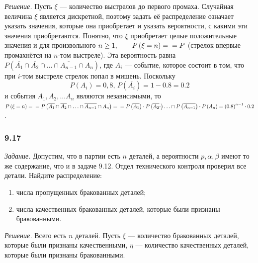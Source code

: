 \textit{Решение.} Пусть $ \xi $ --- количество выстрелов до первого промаха.
Случайная величина $ \xi $ является дискретной,
поэтому задать её распределение означает указать значения, которые она приобретает и указать вероятности, с какими эти значения приобретаются.
Понятно, что $ \xi $ приобретает целые положительные значения и для произвольного $n \geq 1, \qquad P \left( \xi = n \right) = \\
= P$
(стрелок впервые промахнётся на $n$-том выстреле).
Эта вероятность равна $P \left( \overline{A_1} \cap \overline{A_2} \cap \dotsc \cap \overline{A_{n-1}} \cap A_n \right) $,
где $A_i$ --- событие, которое состоит в том, что при $i$-том выстреле стрелок попал в мишень.
Поскольку
$$P \left( A_i \right) = 0,8, \,
P \left( \overline{A_i} \right) = 1 - 0.8 = 0.2$$
и события $A_1, A_2, \dotsc A_n$ являются независимыми,
то
$P \left( \xi = n \right) = \\
= P \left( \overline{A_1} \cap \overline{A_2} \cap \dotsc \cap \overline{A_{n-1}} \cap A_n \right) = \\
= P \left( \overline{A_1} \right) \cdot P \left( \overline{A_2} \cdot \right) \dotsc \cap P \left( \overline{A_{n-1}} \right) \cdot P \left( A_n \right) =
\left( 0.8 \right)^{n-1} \cdot 0.2$.

\subsubsection*{9.17}

\textit{Задание.} Допустим, что в партии есть $n$ деталей, а вероятности $p, \alpha, \beta $ имеют то же содержание, что и в задаче 9.12.
Отдел технического контроля проверил все детали.
Найдите распределение:
\begin{enumerate}[label=\alph*)]
\item числа пропущенных бракованных деталей;
\item числа качественных бракованных деталей, которые были признаны бракованными. 
\end{enumerate}

\textit{Решение.} Всего есть $n$ деталей.
Пусть $ \xi $ --- количество бракованных деталей,
которые были признаны качественными, $ \eta $ --- количество качественных деталей, которые были признаны бракованными.

